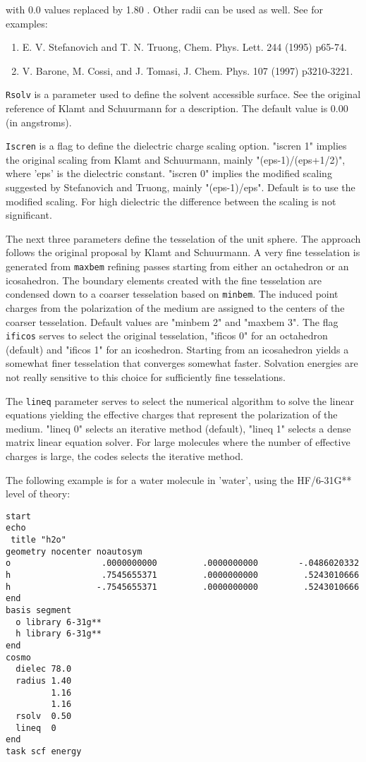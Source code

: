 with 0.0 values replaced by 1.80 . Other radii can be used as well.
See for examples:

\begin{enumerate}
\item E. V. Stefanovich and T. N. Truong, Chem. Phys. Lett. 244 (1995)
p65-74.
\item V. Barone, M. Cossi, and J. Tomasi, J. Chem. Phys. 107 (1997)
p3210-3221.
\end{enumerate}

\verb+Rsolv+ is a parameter used to define the solvent accessible
surface. See the original reference of Klamt and Schuurmann for a
description. The default value is 0.00 (in angstroms).

\verb+Iscren+ is a flag to define the dielectric charge scaling option.
"iscren 1" implies the original scaling from Klamt and Schuurmann,
mainly "(eps-1)/(eps+1/2)", where 'eps' is the dielectric constant.
"iscren 0" implies the modified scaling suggested by Stefanovich and
Truong, mainly "(eps-1)/eps". Default is to use the modified scaling.
For high dielectric the difference between the scaling is not 
significant.

The next three parameters define the tesselation of the unit sphere.
The approach follows the original proposal by Klamt and Schuurmann.
A very fine tesselation is generated from \verb+maxbem+ refining 
passes starting from either an octahedron or an icosahedron. The
boundary elements created with the fine tesselation are condensed
down to a coarser tesselation based on \verb+minbem+. The induced
point charges from the polarization of the medium are assigned to
the centers of the coarser tesselation. Default values are
"minbem 2" and "maxbem 3". The flag \verb+ificos+ serves to
select the original tesselation, "ificos 0" for an octahedron
(default) and "ificos 1" for an icoshedron. Starting from an icosahedron
yields a somewhat finer tesselation that converges somewhat faster.
Solvation energies are not really sensitive to this choice for
sufficiently fine tesselations.

The \verb+lineq+ parameter serves to select the numerical algorithm to solve
the linear equations yielding the effective charges that represent
the polarization of the medium. "lineq 0" selects an iterative method 
(default), "lineq 1" selects a dense matrix linear equation solver.
For large molecules where the number of effective charges is large,
the codes selects the iterative method.

The following example is for a water molecule in 'water', using
the HF/6-31G** level of theory:

\begin{verbatim}
start
echo
 title "h2o"
geometry nocenter noautosym
o                  .0000000000         .0000000000        -.0486020332
h                  .7545655371         .0000000000         .5243010666
h                 -.7545655371         .0000000000         .5243010666
end
basis segment
  o library 6-31g**
  h library 6-31g**
end
cosmo
  dielec 78.0
  radius 1.40
         1.16
         1.16
  rsolv  0.50
  lineq  0
end
task scf energy
\end{verbatim}
